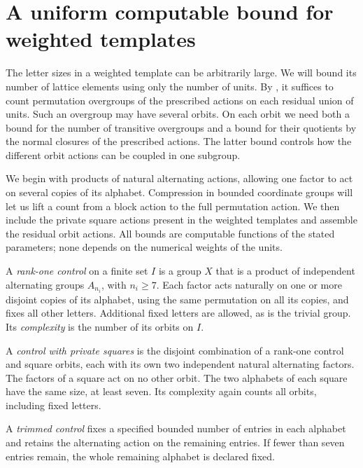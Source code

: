 \section{A uniform computable bound for weighted templates}
\label{sec:counting}

The letter sizes in a weighted template can be arbitrarily large.
We will bound its number of lattice elements using only the number of
units.  By , it suffices to count permutation
overgroups of the prescribed actions on each residual union of units.
Such an overgroup may have several orbits.  On each orbit we need both a
bound for the number of transitive overgroups and a bound for their
quotients by the normal closures of the prescribed actions.  The latter
bound controls how the different orbit actions can be coupled in one
subgroup.

We begin with products of natural alternating actions, allowing one
factor to act on several copies of its alphabet.  Compression in bounded
coordinate groups will let us lift a count from a block action to the
full permutation action.  We then include the private square actions
present in the weighted templates and assemble the residual orbit
actions.  All bounds are computable functions of the stated parameters;
none depends on the numerical weights of the units.

\begin{definition}[Controls]\label{n:controls}
A \emph{rank-one control} on a finite set $I$ is a group $X$ that is a
product of independent alternating groups $A_{n_i}$, with $n_i\ge7$.
Each factor acts naturally on one or more disjoint copies of its alphabet,
using the same permutation on all its copies, and fixes all other letters.
Additional fixed letters are allowed, as is the trivial group.  Its
\emph{complexity} is the number of its orbits on $I$.

A \emph{control with private squares} is the disjoint combination of a
rank-one control and square orbits, each with its own two independent
natural alternating factors.  The factors of a square act on no other
orbit.  The two alphabets of each square have the same size, at least
seven.  Its complexity again counts all orbits, including fixed letters.

A \emph{trimmed control} fixes a specified bounded number of entries in
each alphabet and retains the alternating action on the remaining entries.
If fewer than seven entries remain, the whole remaining alphabet is
declared fixed.
\end{definition}

